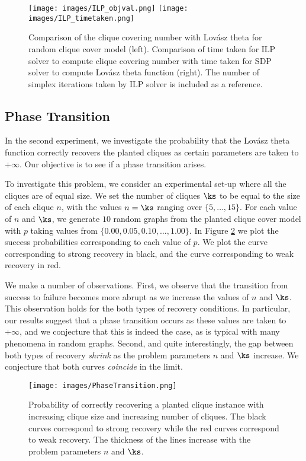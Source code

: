 \begin{figure}[H]
\centering
\texttt{[image: images/ILP\_objval.png]}
\texttt{[image: images/ILP\_timetaken.png]}
\caption{Comparison of the clique covering number with Lov\'asz theta for random clique cover model (left).  Comparison of time taken for ILP solver to compute clique covering number with time taken for SDP solver to compute Lov\'asz theta function (right). The number of simplex iterations taken by ILP solver is included as a reference.}
\label{fig:ILP}
\end{figure}




\subsection{Phase Transition}



In the second experiment, we investigate the probability that the Lov\'asz theta function correctly recovers the planted cliques as certain parameters are taken to $+\infty$.  Our objective is to see if a phase transition arises.

To investigate this problem, we consider an experimental set-up where all the cliques are of equal size.  We set the number of cliques $\ks$ to be equal to the size of each clique $n$, with the values $n = \ks$ ranging over $\{5,\ldots, 15\}$.  For each value of $n$ and $\ks$, we generate $10$ random graphs from the planted clique cover model with $p$ taking values from $\{ 0.00, 0.05, 0.10, \ldots, 1.00 \}$.  In Figure \ref{fig:phasetransition} we plot the success probabilities corresponding to each value of $p$.  We plot the curve corresponding to strong recovery in black, and the curve corresponding to weak recovery in red.

We make a number of observations.  First, we observe that the transition from success to failure becomes more abrupt as we increase the values of $n$ and $\ks$.  This observation holds for the both types of recovery conditions.  In particular, our results suggest that a phase transition occurs as these values are taken to $+\infty$, and we conjecture that this is indeed the case, as is typical with many phenomena in random graphs.  Second, and quite interestingly, the gap between both types of recovery {\em shrink} as the problem parameters $n$ and $\ks$ increase.  We conjecture that both curves {\em coincide} in the limit.

\begin{figure}[H]
\centering
\texttt{[image: images/PhaseTransition.png]}
\caption{Probability of correctly recovering a planted clique instance with increasing clique size and increasing number of cliques.  The black curves correspond to strong recovery while the red curves correspond to weak recovery.  The thickness of the lines increase with the problem parameters $n$ and $\ks$.}
\label{fig:phasetransition}
\end{figure}

